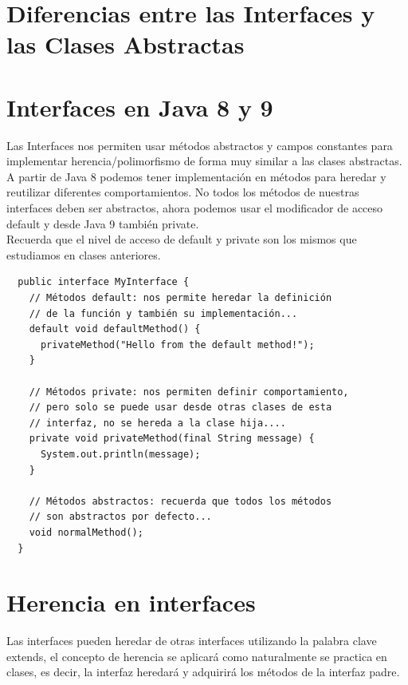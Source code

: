 \documentclass{article}
\begin{document}
\section{Diferencias entre las Interfaces y las Clases Abstractas}%


\section{Interfaces en Java 8 y 9}%
Las Interfaces nos permiten usar métodos abstractos y campos constantes para
implementar herencia/polimorfismo de forma muy similar a las clases
abstractas.\\

A partir de Java 8 podemos tener implementación en métodos para heredar y
reutilizar diferentes comportamientos. No todos los métodos de nuestras
interfaces deben ser abstractos, ahora podemos usar el modificador de acceso
default y desde Java 9 también private.\\

Recuerda que el nivel de acceso de default y private son los mismos que
estudiamos en clases anteriores.\\

\begin{verbatim}
  public interface MyInterface {
    // Métodos default: nos permite heredar la definición
    // de la función y también su implementación...
    default void defaultMethod() {
      privateMethod("Hello from the default method!");
    }

    // Métodos private: nos permiten definir comportamiento,
    // pero solo se puede usar desde otras clases de esta
    // interfaz, no se hereda a la clase hija....
    private void privateMethod(final String message) {
      System.out.println(message);
    }

    // Métodos abstractos: recuerda que todos los métodos
    // son abstractos por defecto...
    void normalMethod();
  }
\end{verbatim}



\section{Herencia en interfaces}%
Las interfaces pueden heredar de otras interfaces utilizando la palabra clave
extends, el concepto de herencia se aplicará como naturalmente se practica en
clases, es decir, la interfaz heredará y adquirirá los métodos de la interfaz
padre.\\
\end{document}
